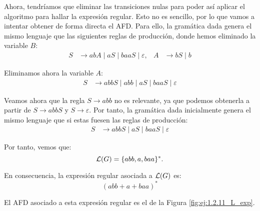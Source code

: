 \begin{ejercicio}
    Ahora, tendríamos que eliminar las transiciones nulas para poder así aplicar el algoritmo para hallar la expresión regular. Esto no es sencillo, por lo que vamos a intentar obtener de forma directa el AFD. Para ello, la gramática dada genera el mismo lenguaje que las siguientes reglas de producción, donde hemos eliminado la variable $B$:
    \begin{align*}
        S &\to abA \mid aS \mid baaS \mid \varepsilon, & A &\to bS \mid b
    \end{align*}

    Eliminamos ahora la variable $A$:
    \begin{align*}
        S &\to abbS \mid abb \mid aS \mid baaS \mid \varepsilon
    \end{align*}

    Veamos ahora que la regla $S \to abb$ no es relevante, ya que podemos obtenerla a partir de $S \to abbS$ y $S \to \varepsilon$. Por tanto, la gramática dada inicialmente genera el mismo lenguaje que si estas fuesen las reglas de producción:
    \begin{align*}
        S &\to abbS \mid aS \mid baaS \mid \varepsilon
    \end{align*}

    Por tanto, vemos que:
    \begin{equation*}
        \mathcal{L}(G)=\{abb, a, baa\}^*.
    \end{equation*}

    En consecuencia, la expresión regular asociada a $\mathcal{L}(G)$ es:
    \begin{equation*}
        (abb + a + baa)^*
    \end{equation*}

    El AFD asociado a esta expresión regular es el de la Figura \ref{fig:ej:1.2.11_L_exp}.
    \begin{figure}
        \centering
\end{figure}
\end{ejercicio}
